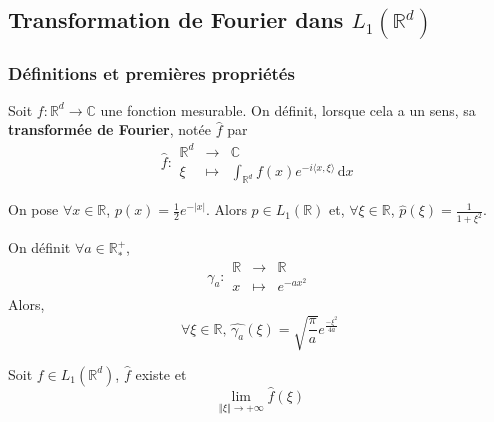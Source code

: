 




	\subsection{Transformation de Fourier dans \texorpdfstring{$L_1(\mathbb{R}^d)$}{L₁(Rᵈ)}}

	\subsubsection{Définitions et premières propriétés}


	\begin{definition}
		Soit $f : \mathbb{R}^d \rightarrow \mathbb{C}$ une fonction mesurable. On définit, lorsque cela a un sens, sa \textbf{transformée de Fourier}, notée $\widehat{f}$ par
		\[
		\widehat{f} :
		\begin{array}{ccc}
			\mathbb{R}^d &\rightarrow& \mathbb{C} \\
			\xi &\mapsto& \int_{\mathbb{R}^d} f(x) e^{-i\langle x, \xi \rangle} \, \mathrm{d}x
		\end{array}
		\]
	\end{definition}

	\begin{example}
		On pose $\forall x \in \mathbb{R}$, $p(x) = \frac{1}{2} e^{-|x|}$. Alors $p \in L_1(\mathbb{R})$ et, $\forall \xi \in \mathbb{R}$, $\widehat{p}(\xi) = \frac{1}{1+\xi^2}$.
	\end{example}


	\begin{example}
		\label{250-1}
		On définit $\forall a \in \mathbb{R}^+_*$,
		\[ \gamma_a :
		\begin{array}{ccc}
			\mathbb{R} &\rightarrow& \mathbb{R} \\
			x &\mapsto& e^{-ax^2}
		\end{array}
		\]
		Alors,
		\[ \forall \xi \in \mathbb{R}, \, \widehat{\gamma_a}(\xi) = \sqrt{\frac{\pi}{a}} e^{\frac{- \xi^2}{4a}} \]
	\end{example}


	\begin{lemma}
		Soit $f \in L_1(\mathbb{R}^d)$, $\widehat{f}$ existe et
		\[ \lim_{\Vert \xi \Vert \rightarrow +\infty} \widehat{f}(\xi) \]
	\end{lemma}

